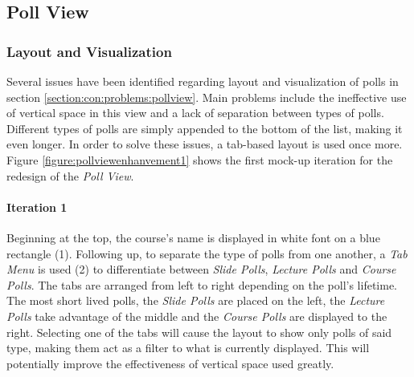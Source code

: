 \subsection{Poll View}

\subsubsection{Layout and Visualization}
Several issues have been identified regarding layout and visualization of polls in section \ref{section:con:problems:pollview}. Main problems include the ineffective use of vertical space in this view and a lack of separation between types of polls. Different types of polls are simply appended to the bottom of the list, making it even longer.
In order to solve these issues, a tab-based layout is used once more. 
Figure \ref{figure:pollviewenhanvement1} shows the first mock-up iteration for the redesign of the \emph{Poll View}.
\paragraph{Iteration 1}
Beginning at the top, the course's name is displayed in white font on a blue rectangle (1). Following up, to separate the type of polls from one another, a \emph{Tab Menu} is used (2) to differentiate between \emph{Slide Polls}, \emph{Lecture Polls} and \emph{Course Polls}. The tabs are arranged from left to right depending on the poll's lifetime. The most short lived polls, the \emph{Slide Polls} are placed on the left, the \emph{Lecture Polls} take advantage of the middle and the \emph{Course Polls} are displayed to the right. Selecting one of the tabs will cause the layout to show only polls of said type, making them act as a filter to what is currently displayed. This will potentially improve the effectiveness of vertical space used greatly. 


